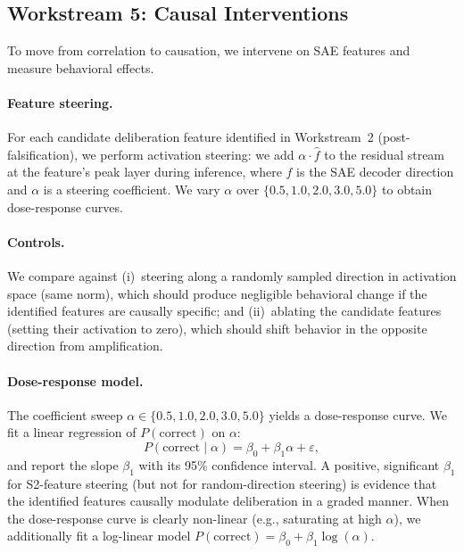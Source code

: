 \subsection{Workstream 5: Causal Interventions}
\label{sec:causal}

To move from correlation to causation, we intervene on SAE features and
measure behavioral effects.

\paragraph{Feature steering.}  For each candidate deliberation feature
identified in Workstream~2 (post-falsification), we perform activation
steering: we add $\alpha \cdot \hat{f}$ to the residual stream at the
feature's peak layer during inference, where $\hat{f}$ is the SAE decoder
direction and $\alpha$ is a steering coefficient.  We vary $\alpha$ over
$\{0.5, 1.0, 2.0, 3.0, 5.0\}$ to obtain dose-response curves.

\paragraph{Controls.}  We compare against (i)~steering along a randomly
sampled direction in activation space (same norm), which should produce
negligible behavioral change if the identified features are causally
specific; and (ii)~ablating the candidate features (setting their
activation to zero), which should shift behavior in the opposite direction
from amplification.

\paragraph{Dose-response model.}  The coefficient sweep
$\alpha \in \{0.5, 1.0, 2.0, 3.0, 5.0\}$ yields a dose-response curve.
We fit a linear regression of $P(\text{correct})$ on $\alpha$:
\begin{equation}
  P(\text{correct} \mid \alpha) = \beta_0 + \beta_1 \alpha + \varepsilon,
  \label{eq:dose}
\end{equation}
and report the slope $\beta_1$ with its 95\% confidence interval.  A
positive, significant $\beta_1$ for S2-feature steering (but not for
random-direction steering) is evidence that the identified features
causally modulate deliberation in a graded manner.  When the
dose-response curve is clearly non-linear (e.g., saturating at high
$\alpha$), we additionally fit a log-linear model
$P(\text{correct}) = \beta_0 + \beta_1 \log(\alpha)$.

